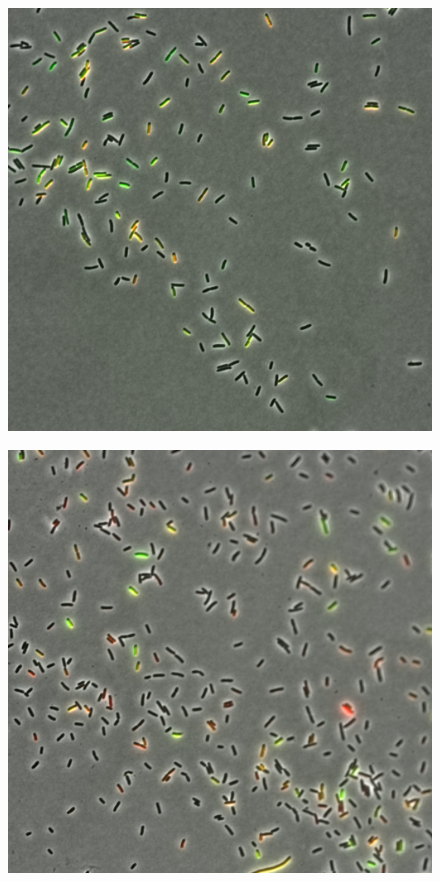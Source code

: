 \documentclass[11pt]{book}
\begin{document}
\begin{figure}
\centering
	\begin{minipage}{.5\textwidth}
  		\centering
  		\includegraphics[width=.9\linewidth]{d8007LateComposite.jpg}
  		\label{fig:onc1AfterHoursComposite}
	\end{minipage}%
	\begin{minipage}{.5\textwidth}
  		\centering
  		\includegraphics[width=.9\linewidth]{h8LateComposite.jpg}
  		\label{fig:onc2AfterHoursComposite}  
	\end{minipage}
\end{figure}
\end{document}
